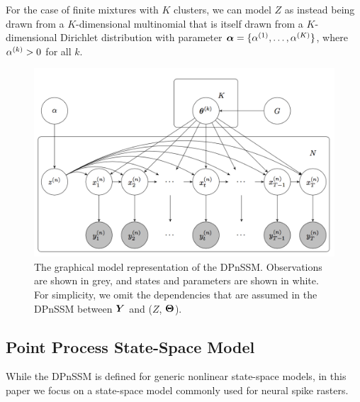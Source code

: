 \documentclass[twoside]{article}
\begin{document}
For the case of finite mixtures with $K$ clusters, we can model $Z$ as instead being drawn from a $K$-dimensional multinomial that is itself drawn from a $K$-dimensional Dirichlet distribution with parameter $\boldsymbol{\alpha} = \{{\alpha}^{(1)}_{}, \ldots, {\alpha}^{(K)}_{}\}$, where ${\alpha}^{(k)}_{} > 0$ for all $k$.  
\begin{figure}[h]
\begin{center}
\includegraphics[scale=0.4]{img/graph.png}
\end{center}
\caption{{The graphical model representation of the DPnSSM. Observations are shown in grey, and states and parameters are shown in white. For simplicity, we omit the dependencies that are assumed in the DPnSSM between $\boldsymbol{Y}$ and ($Z$, $\boldsymbol{\Theta}$).}}
\label{model-graph}
\end{figure}

\subsection{Point Process State-Space Model}
\label{ppssm}
While the DPnSSM is defined for generic nonlinear state-space models, in this paper we focus on a state-space model commonly used for neural spike rasters.
\end{document}
